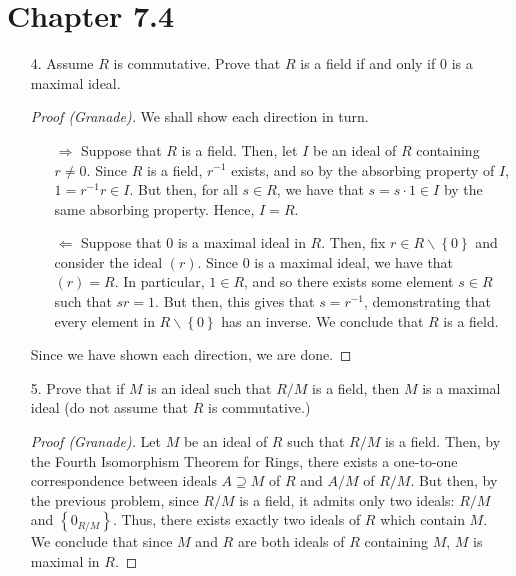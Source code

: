 \documentclass[10pt]{article}
\begin{document}
\section*{Chapter 7.4}

\begin{itemize}

\item [4.] Assume $R$ is commutative. Prove that $R$ is a field if and
only if $0$ is a maximal ideal. 

\begin{proof}[Proof (Granade)]
We shall show each direction in turn.
\begin{itemize}
\item [$\Rightarrow$] Suppose that $R$ is a field. Then, let $I$ be
an ideal of $R$ containing $r\ne0$. Since $R$ is a field, $r^{-1}$
exists, and so by the absorbing property of $I$, $1=r^{-1}r\in I$.
But then, for all $s\in R$, we have that $s=s\cdot1\in I$ by the
same absorbing property. Hence, $I=R$.
\item [$\Leftarrow$] Suppose that $0$ is a maximal ideal in $R$. Then,
fix $r\in R\backslash\left\{ 0\right\} $ and consider the ideal $\left(r\right)$.
Since $0$ is a maximal ideal, we have that $\left(r\right)=R$. In
particular, $1\in R$, and so there exists some element $s\in R$
such that $sr=1$. But then, this gives that $s=r^{-1}$, demonstrating
that every element in $R\backslash\left\{ 0\right\} $ has an inverse.
We conclude that $R$ is a field.
\end{itemize}
Since we have shown each direction, we are done.
\end{proof}

\newpage

\item [5.] Prove that if $M$ is an ideal such that $R/M$ is a field,
then $M$ is a maximal ideal (do not assume that $R$ is commutative.)


\begin{proof}[Proof (Granade)]
Let $M$ be an ideal of $R$ such that $R/M$ is a field. Then, by
the Fourth Isomorphism Theorem for Rings, there exists a one-to-one
correspondence between ideals $A\supseteq M$ of $R$ and $A/M$ of
$R/M$. But then, by the previous problem, since $R/M$ is a field,
it admits only two ideals: $R/M$ and $\left\{ 0_{R/M}\right\} $.
Thus, there exists exactly two ideals of $R$ which contain $M$.
We conclude that since $M$ and $R$ are both ideals of $R$ containing
$M$, $M$ is maximal in $R$.
\end{proof}



\end{itemize}
\end{document}

